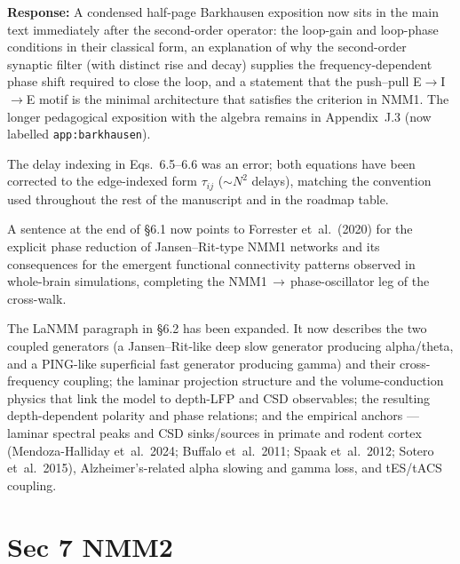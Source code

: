 \documentclass[12pt,a4paper]{article}
\newcommand{\ourresponse}[1]{\par\noindent\textbf{Response:} #1\par\medskip}
\begin{document}
\ourresponse{A condensed half-page Barkhausen exposition now sits in the main text immediately after the second-order operator: the loop-gain and loop-phase conditions in their classical form, an explanation of why the second-order synaptic filter (with distinct rise and decay) supplies the frequency-dependent phase shift required to close the loop, and a statement that the push--pull E$\to$I$\to$E motif is the minimal architecture that satisfies the criterion in NMM1. The longer pedagogical exposition with the algebra remains in Appendix~J.3 (now labelled \Verb|app:barkhausen|).

The delay indexing in Eqs.~6.5--6.6 was an error; both equations have been corrected to the edge-indexed form $\tau_{ij}$ ($\sim\!N^{2}$ delays), matching the convention used throughout the rest of the manuscript and in the roadmap table.

A sentence at the end of §6.1 now points to Forrester et~al.~(2020) for the explicit phase reduction of Jansen--Rit-type NMM1 networks and its consequences for the emergent functional connectivity patterns observed in whole-brain simulations, completing the NMM1\,$\to$\,phase-oscillator leg of the cross-walk.

The LaNMM paragraph in §6.2 has been expanded. It now describes the two coupled generators (a Jansen--Rit-like deep slow generator producing alpha/theta, and a PING-like superficial fast generator producing gamma) and their cross-frequency coupling; the laminar projection structure and the volume-conduction physics that link the model to depth-LFP and CSD observables; the resulting depth-dependent polarity and phase relations; and the empirical anchors --- laminar spectral peaks and CSD sinks/sources in primate and rodent cortex (Mendoza-Halliday et~al.~2024; Buffalo et~al.~2011; Spaak et~al.~2012; Sotero et~al.~2015), Alzheimer's-related alpha slowing and gamma loss, and tES/tACS coupling.}

\section*{Sec 7 NMM2}
\end{document}
